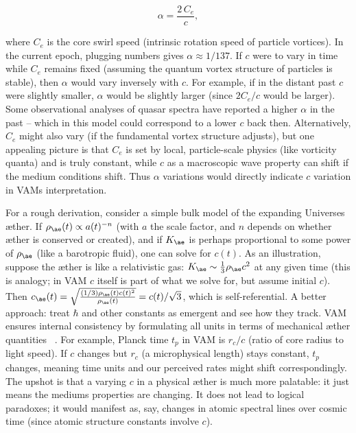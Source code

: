 \documentclass[a4paper, aps,preprint,superscriptaddress, 12pt]{revtex4}
\begin{document}
\begin{equation}
    \alpha = \frac{2\,C_e}{c},
\end{equation}

where $C_e$ is the core swirl speed (intrinsic rotation speed of particle vortices). In the current epoch, plugging numbers gives $\alpha\approx1/137$. If $c$ were to vary in time while $C_e$ remains fixed (assuming the quantum vortex structure of particles is stable), then $\alpha$ would vary inversely with $c$. For example, if in the distant past $c$ were slightly smaller, $\alpha$ would be slightly larger (since $2C_e/c$ would be larger). Some observational analyses of quasar spectra have reported a higher $\alpha$ in the past – which in this model could correspond to a lower $c$ back then. Alternatively, $C_e$ might also vary (if the fundamental vortex structure adjusts), but one appealing picture is that $C_e$ is set by local, particle-scale physics (like vorticity quanta) and is truly constant, while $c$ as a macroscopic wave property can shift if the medium conditions shift. Thus $\alpha$ variations would directly indicate $c$ variation in VAM\rqs s interpretation.


For a rough derivation, consider a simple bulk model of the expanding Universe\rqs s æther. If $\rho_{\ae}(t) \propto a(t)^{-n}$ (with $a$ the scale factor, and $n$ depends on whether æther is conserved or created), and if $K_{\ae}$ is perhaps proportional to some power of $\rho_{\ae}$ (like a barotropic fluid), one can solve for $c(t)$. As an illustration, suppose the æther is like a relativistic gas: $K_{\ae}\sim \frac{1}{3}\rho_{\ae}c^2$ at any given time (this is analogy; in VAM $c$ itself is part of what we solve for, but assume initial $c$). Then $c_{\ae}(t) = \sqrt{\frac{(1/3)\rho_{\ae}(t)c(t)^2}{\rho_{\ae}(t)}} = c(t)/\sqrt{3}$, which is self-referential. A better approach: treat $\hbar$ and other constants as emergent and see how they track. VAM ensures internal consistency by formulating all units in terms of mechanical æther quantities~\cite{Iskandarani2025c} . For example, Planck time $t_p$ in VAM is $r_c/c$ (ratio of core radius to light speed). If $c$ changes but $r_c$ (a microphysical length) stays constant, $t_p$ changes, meaning time units and our perceived rates might shift correspondingly. The upshot is that a varying $c$ in a physical æther is much more palatable: it just means the medium\rqs s properties are changing. It does not lead to logical paradoxes; it would manifest as, say, changes in atomic spectral lines over cosmic time (since atomic structure constants involve $c$).
\end{document}
